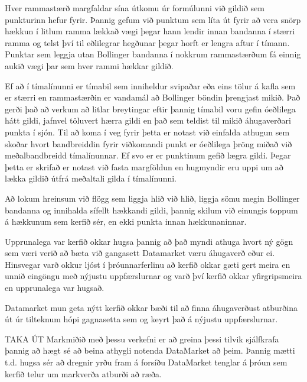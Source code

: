 \documentclass{article}
\begin{document}
Hver rammastærð margfaldar sína útkomu úr formúlunni
við gildið sem punkturinn hefur fyrir.
Þannig gefum við punktum sem líta út fyrir að vera
snörp hækkun í litlum ramma lækkað vægi þegar hann
lendir innan bandanna í stærri ramma
og telst því til eðlilegrar hegðunar þegar horft er
lengra aftur í tímann.
Punktar sem leggja utan Bollinger bandanna í nokkrum
rammastærðum fá einnig aukið vægi þar sem hver rammi
hækkar gildið.

Ef að í tímalínunni er tímabil sem inniheldur svipaðar
eða eins tölur á kafla sem er stærri en rammastærðin er
vandamál að Bollinger 
böndin þrengjast mikið. Það gerði það að verkum að
litlar breytingar eftir þannig tímabil voru gefin
óeðlilega hátt gildi, 
jafnvel töluvert hærra gildi en það sem teldist til
mikið áhugaverðari punkta í sjón. Til að koma í veg
fyrir þetta er notast við
einfalda athugun sem skoðar hvort bandbreiddin fyrir
viðkomandi punkt er óeðlilega þröng miðað við
meðalbandbreidd tímalínunnar.
Ef svo er er punktinum gefið lægra gildi. Þegar þetta
er skrifað er notast við fasta margföldun en hugmyndir
eru uppi um að lækka 
gildið útfrá meðaltali gilda í tímalínunni.

Að lokum hreinsum við flögg sem liggja hlið við hlið,
liggja sömu megin Bollinger bandanna og innihalda
sífellt hækkandi gildi, 
þannig skilum við einungis toppum á hækkunum sem kerfið
sér, en ekki punkta innan hækkunaninnar.













Upprunalega var kerfið okkar hugsa þannig að það myndi athuga hvort ný gögn sem væri verið að bæta við gangasett Datamarket væru áhugaverð eður ei. Hinsvegar varð okkur ljóst í þróunnarferlinu að kerfið okkar gæti gert meira en unnið eingöngu með nýjustu uppfærslurnar og varð því kerfið okkar yfirgripsmeira en upprunalega var hugsað.

Datamarket mun geta nýtt kerfið okkar bæði til að finna áhugaverðust atburðina út úr tilteknum hópi gagnasetta sem og keyrt það á nýjustu uppfærslurnar.

TAKA ÚT Markmiðið með þessu verkefni er að greina þessi tilvik sjálfkrafa þannig að hægt sé að beina athygli notenda DataMarket að þeim. Þannig mætti t.d. hugsa sér að dregnir yrðu fram á forsíðu DataMarket tenglar á þróun sem kerfið telur um markverða atburði að ræða.
\end{document}
